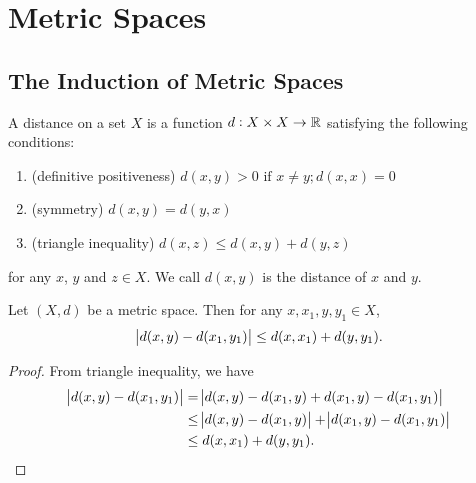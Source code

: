 \chapter{Metric Spaces}
\label{chp:metric_spaces}
\section{The Induction of Metric Spaces}
\label{sec:metric_space}
\begin{defn}
\label{defn:metric_space}
A distance on a set $X$ is a function $d: X \times X \to \mathbb{R}$ satisfying 
the following conditions:
\begin{enumerate}
\item (definitive positiveness) $d(x, y) > 0  \text{  if } 
x \neq y; d(x, x) = 0$
\item (symmetry) $d(x, y) = d(y, x)$
\item (triangle inequality) $d(x, z) \le d(x, y) + d(y, z)$
\end{enumerate}
for any $x$, $y$ and $z \in X$. We call $d(x, y)$ is the distance of $x$ and 
$y$.
\end{defn}

\begin{prop}
Let $(X, d)$ be a metric space. Then for any $x, x_1, y, y_1 \in X$, 
\begin{equation}
\label{equ:metric_spaces:four_points_inequality}
\abs{d(x, y) - d(x_1, y_1)} \le d(x, x_1) + d(y, y_1). 
\end{equation}
\end{prop}
\begin{proof}
From triangle inequality, we have 
\begin{equation*}
    \begin{aligned}
        \abs{d(x, y) - d(x_1, y_1)} 
        &= \abs{d(x, y) - d(x_1, y) + d(x_1, y) - d(x_1, y_1)} \\
        &\le \abs{d(x, y) - d(x_1, y)} + \abs{d(x_1, y) - d(x_1, y_1)} \\
        &\le d(x, x_1) + d(y, y_1). 
    \end{aligned}
\end{equation*}
\end{proof}

